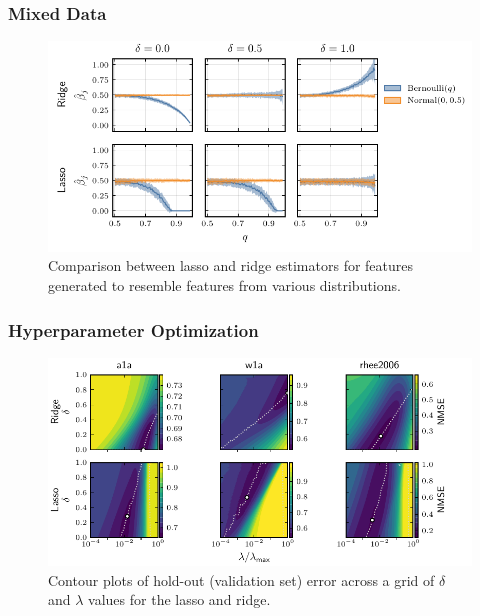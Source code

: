 \documentclass[aspectratio=1610,onlytextwidth]{beamer}
\begin{document}
\begin{frame}[c]
  \frametitle{Mixed Data}

  \begin{figure}[htpb]
    \centering
    \includegraphics[]{figures/paper6-mixed_data.pdf}
    \caption{%
      Comparison between lasso and ridge estimators for features generated to resemble features from various distributions.}
  \end{figure}
\end{frame}

\begin{frame}[c]
  \frametitle{Hyperparameter Optimization}


  \begin{figure}[htpb]
    \centering
    \includegraphics{figures/hyperopt_surfaces.pdf}
    \caption{%
      Contour plots of hold-out (validation set) error across a grid of \(\delta\) and \(\lambda\) values for the
      lasso and ridge.
    }
  \end{figure}

\end{frame}
\end{document}
